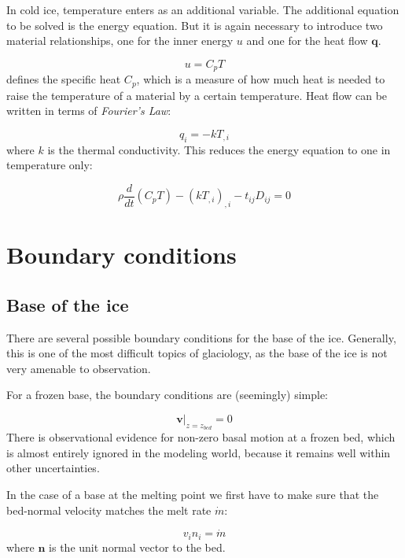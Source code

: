 \documentclass[12pt, openany]{memoir}
\begin{document}
In cold ice, temperature enters as an additional variable. The
additional equation to be solved is the energy equation. But it is
again necessary to introduce two material relationships, one for the
inner energy $u$ and one for the heat flow $\mathbf{q}$. 

\begin{equation}
u = C_p T
\end{equation}
defines the specific heat $C_p$, which is a measure of how much heat
is needed to raise the temperature of a material by a certain
temperature. Heat flow can be written in terms of \emph{Fourier's
  Law}:

\begin{equation}
q_i = -k T_{,i}
\end{equation}
where $k$ is the thermal conductivity. This reduces the energy
equation to one in temperature only: 

\begin{equation}
\rho \frac{d}{dt} (C_pT) - (k T_{,i})_{,i} - t_{ij}D_{ij} = 0
\end{equation}

\section{Boundary conditions}

\subsection{Base of the ice}

There are several possible boundary conditions for the base of
the ice. Generally, this is one of the most difficult topics of
glaciology, as the base of the ice is not very amenable to
observation.

For a frozen base, the boundary conditions are (seemingly) simple:

\begin{equation}
\mathbf{v}|_{z=z_{bed}} = 0
\end{equation}
There is observational evidence for non-zero basal motion at a frozen
bed, which is almost entirely ignored in the modeling world, because
it remains well within other uncertainties.

In the case of a base at the melting point we first have to make sure
that the bed-normal velocity matches the melt rate $\dot{m}$:

\begin{equation}
v_i n_i = \dot{m}
\end{equation} 
where $\mathbf{n}$ is the unit normal vector to the bed. 
\end{document}
